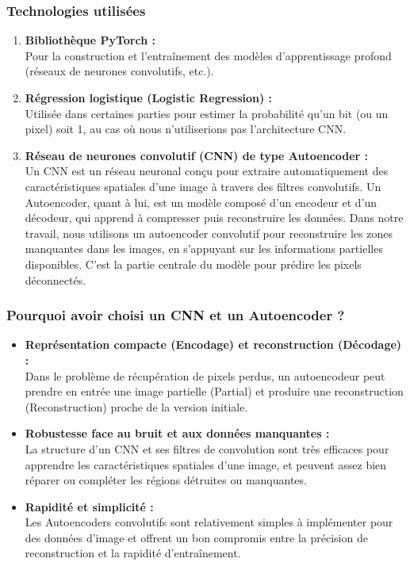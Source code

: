 \documentclass[a4paper,12pt]{article}
\begin{document}
\subsubsection{Technologies utilisées}
\begin{enumerate}
    \item \textbf{Bibliothèque PyTorch :}\\
    Pour la construction et l'entraînement des modèles d'apprentissage profond (réseaux de neurones convolutifs, etc.).

    \item \textbf{Régression logistique (Logistic Regression) :}\\
    Utilisée dans certaines parties pour estimer la probabilité qu'un bit (ou un pixel) soit 1, au cas où nous n'utiliserions pas l'architecture CNN.

    \item \textbf{Réseau de neurones convolutif (CNN) de type Autoencoder :}\\
    Un CNN est un réseau neuronal conçu pour extraire automatiquement des caractéristiques spatiales d’une image à travers des filtres convolutifs. Un Autoencoder, quant à lui, est un modèle composé d’un encodeur et d’un décodeur, qui apprend à compresser puis reconstruire les données. Dans notre travail, nous utilisons un autoencoder convolutif pour reconstruire les zones manquantes dans les images, en s’appuyant sur les informations partielles disponibles. C'est la partie centrale du modèle pour prédire les pixels déconnectés.

\end{enumerate}

\subsubsection{Pourquoi avoir choisi un CNN et un Autoencoder ?}
\begin{itemize}
    \item \textbf{Représentation compacte (Encodage) et reconstruction (Décodage) :}\\
    Dans le problème de récupération de pixels perdus, un autoencodeur peut prendre en entrée une image partielle (Partial) et produire une reconstruction (Reconstruction) proche de la version initiale.

    \item \textbf{Robustesse face au bruit et aux données manquantes :}\\
    La structure d'un CNN et ses filtres de convolution sont très efficaces pour apprendre les caractéristiques spatiales d'une image, et peuvent assez bien réparer ou compléter les régions détruites ou manquantes.

    \item \textbf{Rapidité et simplicité :}\\
    Les Autoencoders convolutifs sont relativement simples à implémenter pour des données d'image et offrent un bon compromis entre la précision de reconstruction et la rapidité d'entraînement.
\end{itemize}
\end{document}
